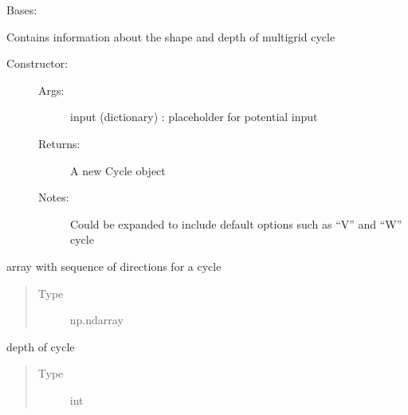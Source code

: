 \documentclass[letterpaper,10pt,english]{sphinxmanual}
\begin{document}
\begin{fulllineitems}
\label{\detokenize{autoapi/Cycle/index:Cycle.Cycle}}
\sphinxAtStartPar
Bases: 

\sphinxAtStartPar
Contains information about the shape and depth of multigrid cycle
\begin{description}
\item[{Constructor:}] \leavevmode\begin{description}
\item[{Args:}] \leavevmode
\sphinxAtStartPar
input (dictionary) : placeholder for potential input

\item[{Returns:}] \leavevmode
\sphinxAtStartPar
A new Cycle object

\item[{Notes:}] \leavevmode
\sphinxAtStartPar
Could be expanded to include default options such as “V” and “W” cycle

\end{description}

\end{description}

\begin{fulllineitems}
\label{\detokenize{autoapi/Cycle/index:Cycle.Cycle.pattern}}
\sphinxAtStartPar
array with sequence of directions for a cycle
\begin{quote}\begin{description}
\item[{Type}] \leavevmode
\sphinxAtStartPar
np.ndarray

\end{description}\end{quote}

\end{fulllineitems}


\begin{fulllineitems}
\label{\detokenize{autoapi/Cycle/index:Cycle.Cycle.levels}}
\sphinxAtStartPar
depth of cycle
\begin{quote}\begin{description}
\item[{Type}] \leavevmode
\sphinxAtStartPar
int


\end{description}
\end{quote}
\end{fulllineitems}
\end{fulllineitems}
\end{document}
